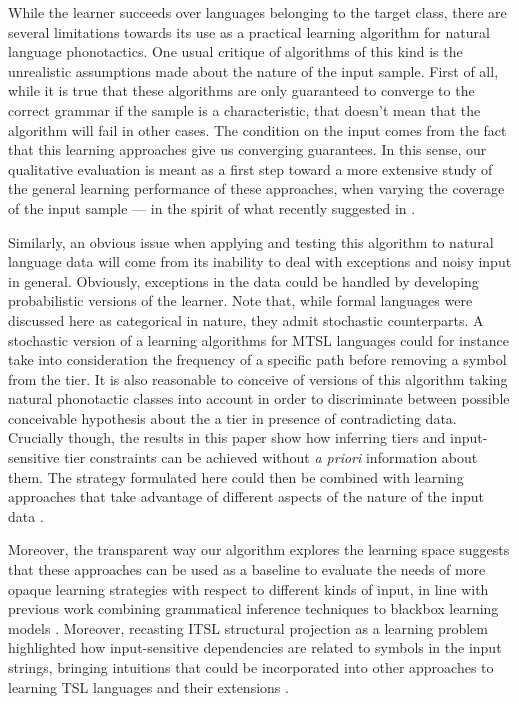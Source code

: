 \documentclass[11pt,a4paper]{article}
\begin{document}
While the learner succeeds over languages belonging to the target class, there are several limitations towards its use as a practical learning algorithm for natural language phonotactics.
One usual critique of algorithms of this kind is the unrealistic assumptions made about the nature of the input sample.
First of all, while it is true that these algorithms are only guaranteed to converge to the correct grammar if the sample is a characteristic, that doesn't mean that the algorithm will fail in other cases.
The condition on the input comes from the fact that this learning approaches give us converging guarantees.
In this sense, our qualitative evaluation is meant as a first step toward a more extensive study of the general learning performance of these approaches, when varying the coverage of the input sample ---  in the spirit of what recently suggested in \citep{aksenova2020tool}.


Similarly, an obvious issue when applying and testing this algorithm to natural language data will come from its inability to deal with exceptions and noisy input in general.
Obviously, exceptions in the data could be handled by developing probabilistic versions of the learner. 
Note that, while formal languages were discussed here as categorical in nature, they admit stochastic counterparts.
A stochastic version of a learning algorithms for MTSL languages could for instance take into consideration the frequency of a specific path before removing a symbol from the tier.
It is also reasonable to conceive of versions of this algorithm taking natural phonotactic classes into account in order to discriminate between possible conceivable hypothesis about the a tier in presence of contradicting data.
Crucially though, the results in this paper show how inferring tiers and input-sensitive tier constraints can be achieved without \emph{a priori} information about them.
The strategy formulated here could then be combined with learning approaches that take advantage of different aspects of the nature of the input data \cite{gouskova2020inducing,rasin2019simultaneous}.

Moreover, the transparent way our algorithm explores the learning space suggests that these approaches can be used as a baseline to evaluate the needs of more opaque learning strategies with respect to different kinds of input, in line with previous work combining  grammatical inference techniques to blackbox learning models \citep[a.o.]{avcu2017subregular,mahalunkar2018using}.
Moreover, recasting ITSL structural projection as a learning problem highlighted how input-sensitive dependencies are related to symbols in the input strings, bringing intuitions that could be incorporated into other approaches to learning TSL languages and their extensions \citep{burness2020modelling}.
 


\end{document}
